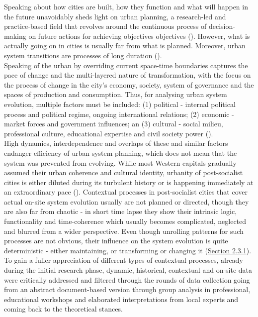 \documentclass[11pt]{report}
\begin{document}
Speaking about how cities are built, how they function and what will happen in the future unavoidably sheds light on urban planning, a research-led and practice-based field that revolves around the continuous process of decision-making on future actions for achieving objectives objectives (\href{Stojkov}{\cite{stojkov_teorijska_2012}}).
However, what is actually going on in cities is usually far from what is planned.
Moreover, urban system transitions are processes of long duration (\href{Braudel}{\cite{braudel_history_1970}}).
\\

Speaking of the urban by overriding current space-time boundaries captures the pace of change and the multi-layered nature of transformation, with the focus on the process of change in the city's economy, society, system of governance and the spaces of production and consumption.
Thus, for analysing urban system evolution, multiple factors must be included:
(1) political - internal political process and political regime, ongoing international relations;
(2) economic - market forces and government influences; 
an
(3) cultural - social milieu, professional  culture, educational  expertise and civil society power (\href{NedovicBudic}{\cite{nedovicbudic_waves_2006}}).
\\

High dynamics, interdependence and overlaps of these and similar factors endanger efficiency of urban system planning, which does not mean that the system was prevented from evolving.
While most Western capitals gradually assumed their urban coherence and cultural identity, urbanity of post-socialist cities is either diluted during its turbulent history or is happening immediately at an extraordinary pace (\href{Doytchinov}{\cite{doytchinov_modernization_2015}}).
Contextual processes in post-socialist cities that cover actual on-site system evolution usually are not planned or directed, though they are also far from chaotic - in short time lapse they show their intrinsic logic, functionality and time-coherence which usually becomes complicated, neglected and blurred from a wider perspective.
Even though unrolling patterns for such processes are not obvious, their influence on the system evolution is quite deterministic - either maintaining, or transforming or changing it (\href{Section 2.3.1}{Section 2.3.1}). 
\\

To gain a fuller appreciation of different types of contextual processes, already during the initial research phase, dynamic, historical, contextual and on-site data were critically addressed and filtered through the rounds of data collection going from an abstract document-based version through group analysis in professional, educational workshops and elaborated interpretations from local experts and coming back to the theoretical stances.
\\
\end{document}
